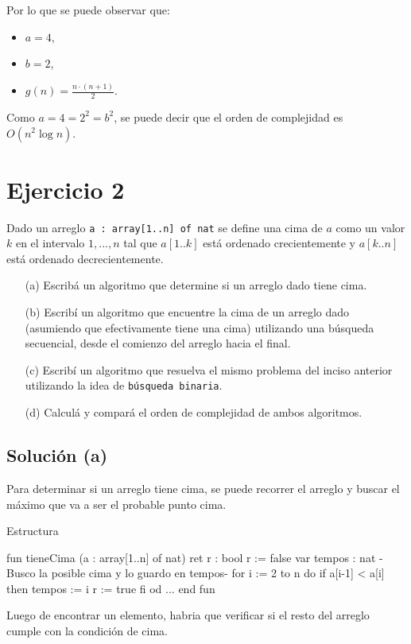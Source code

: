 Por lo que se puede observar que:
\begin{itemize}
    \item $a = 4$,
    \item $b = 2$,
    \item $g(n) = \frac{n\cdot (n+1)}{2}$.
\end{itemize}
Como $a = 4 = 2^2 = b^2$, se puede decir que el orden de complejidad es $O(n^2 \log n)$.

\section{Ejercicio 2}
Dado un arreglo \texttt{a : array[1..n] of nat} se define una cima de $a$ como un valor $k$ en el intervalo $1, . . . ,n$ tal que $a[1..k]$ está ordenado crecientemente y $a[k..n]$ está ordenado decrecientemente.
\begin{itemize}
    \item[(a)] Escribá un algoritmo que determine si un arreglo dado tiene cima.
    \item[(b)] Escribí un algoritmo que encuentre la cima de un arreglo dado (asumiendo que efectivamente tiene una cima) utilizando una búsqueda secuencial, desde el comienzo del arreglo hacia el final. 
    \item[(c)] Escribí un algoritmo que resuelva el mismo problema del inciso anterior utilizando la idea de \texttt{búsqueda binaria}.
    \item[(d)] Calculá y compará el orden de complejidad de ambos algoritmos.
\end{itemize}

\subsection{Solución (a)}
Para determinar si un arreglo tiene cima, se puede recorrer el arreglo y buscar el máximo que va a ser el probable punto cima.

\begin{codebox}{Estructura}
\begin{pascallike}
fun tieneCima (a : array[1..n] of nat) ret r : bool
    r := false
    var tempos : nat
    {-Busco la posible cima y lo guardo en tempos-}
    for i := 2 to n do
        if a[i-1] < a[i] then
            tempos := i
            r := true
        fi
    od
    ...
end fun
\end{pascallike}
\end{codebox}

Luego de encontrar un elemento, habria que verificar si el resto del arreglo cumple con la condición de cima.

